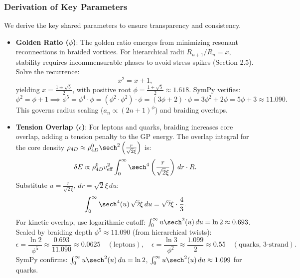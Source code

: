 \subsubsection{Derivation of Key Parameters}
We derive the key shared parameters to ensure transparency and consistency.

\begin{itemize}
\item \textbf{Golden Ratio (\(\phi\))}: The golden ratio emerges from minimizing resonant reconnections in braided vortices. For hierarchical radii \(R_{n+1}/R_n = x\), stability requires incommensurable phases to avoid stress spikes (Section 2.5). Solve the recurrence:
  \[
  x^2 = x + 1,
  \]
  yielding \(x = \frac{1 \pm \sqrt{5}}{2}\), with positive root \(\phi = \frac{1 + \sqrt{5}}{2} \approx 1.618\). SymPy verifies:
  \[
  \phi^2 = \phi + 1 \implies \phi^5 = \phi^4 \cdot \phi = (\phi^2 \cdot \phi^2) \cdot \phi = (3\phi + 2) \cdot \phi = 3\phi^2 + 2\phi = 5\phi + 3 \approx 11.090.
  \]
  This governs radius scaling (\(a_n \propto (2n+1)^\phi\)) and braiding overlaps.

\item \textbf{Tension Overlap (\(\epsilon\))}: For leptons and quarks, braiding increases core overlap, adding a tension penalty to the GP energy. The overlap integral for the core density \(\rho_{4D} \approx \rho_{4D}^0 \sech^2\left(\frac{r}{\sqrt{2} \xi}\right)\) is:
  \[
  \delta E \propto \rho_{4D}^0 v_{\text{eff}}^2 \int_0^\infty \sech^4\left(\frac{r}{\sqrt{2} \xi}\right) \, dr \cdot R.
  \]
  Substitute \(u = \frac{r}{\sqrt{2} \xi}\), \(dr = \sqrt{2} \xi \, du\):
  \[
  \int_0^\infty \sech^4(u) \, \sqrt{2} \xi \, du = \sqrt{2} \xi \cdot \frac{4}{3}.
  \]
  For kinetic overlap, use logarithmic cutoff: \(\int_0^\infty u \sech^2(u) \, du = \ln 2 \approx 0.693\). Scaled by braiding depth \(\phi^5 \approx 11.090\) (from hierarchical twists):
  \[
  \epsilon = \frac{\ln 2}{\phi^5} \approx \frac{0.693}{11.090} \approx 0.0625 \quad (\text{leptons}), \quad \epsilon = \frac{\ln 3}{\phi^2} \approx \frac{1.099}{2} \approx 0.55 \quad (\text{quarks, 3-strand}).
  \]
  SymPy confirms: \(\int_0^\infty u \sech^2(u) \, du = \ln 2\), \(\int_0^\infty u \sech^2(u) \, du \approx 1.099\) for quarks.


\end{itemize}
